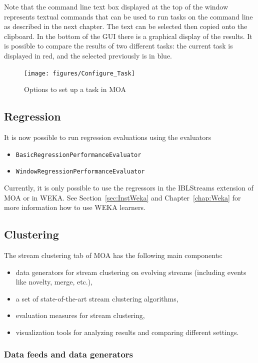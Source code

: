 \documentclass[a4paper,12pt,twoside]{book}
\begin{document}
Note that the command line text box displayed at the top of the window represents textual commands that can be used to run tasks on the command line as described in the next chapter.
The text can be selected then copied onto the clipboard. 
In the bottom of the GUI there is a graphical display of the results. It is possible
to compare the results of two different tasks: the current task is displayed in red, and the selected previously is in blue. 

\begin{figure}[t]
\begin{center}
\texttt{[image: figures/Configure\_Task]}\end{center}
\caption{Options to set up a task in MOA}
\end{figure}

\subsection{Regression}

It is now possible to run regression evaluations using the evaluators
\begin{itemize}
\item {\tt BasicRegressionPerformanceEvaluator}  
\item {\tt WindowRegressionPerformanceEvaluator}
\end{itemize}
Currently, it is only possible to use the regressors in the IBLStreams extension of MOA or in WEKA.
See Section~\ref{sec:InstWeka} and Chapter~\ref{chap:Weka} for more information how to use WEKA learners. 


\subsection{Clustering}

The stream clustering tab of MOA has the following main components:
\begin{itemize}
	\item data generators for stream clustering on evolving streams (including events like novelty, merge, etc.),
	\item a set of state-of-the-art stream clustering algorithms,
	\item evaluation measures for stream clustering,
	\item visualization tools for analyzing results and comparing different settings.
\end{itemize}

\subsubsection{Data feeds and data generators}
\label{sec:generators}
\end{document}
